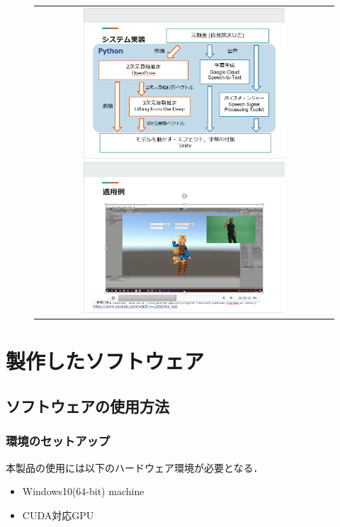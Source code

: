 \documentclass[a4paper,12pt]{jsarticle}
\begin{document}
\begin{figure}[H]
	\begin{center}
		\begin{tabular}{c}
			\begin{minipage}{0.50\hsize}
				\centering
				\includegraphics[width=7.5cm]{./fig/slide1.png}
			\end{minipage}

			\begin{minipage}{0.50\hsize}
				\centering
				\includegraphics[width=7.5cm]{./fig/slide2.png}
			\end{minipage}
		\end{tabular}
	\end{center}
\end{figure}

\section{製作したソフトウェア}
\subsection{ソフトウェアの使用方法}
\subsubsection{環境のセットアップ}
本製品の使用には以下のハードウェア環境が必要となる．
\begin{itemize}
  \item Windows10(64-bit) machine
  \item CUDA対応GPU
\end{itemize}
\end{document}
